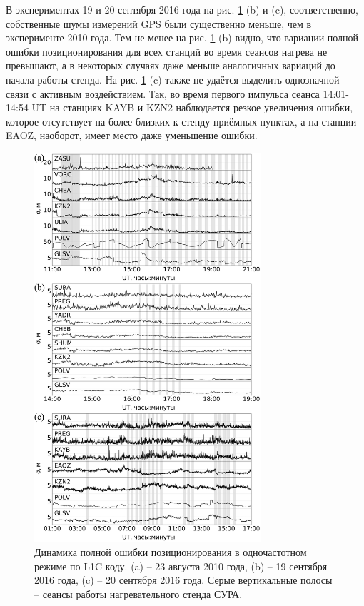В экспериментах 19 и 20 сентября 2016 года на рис. \ref{fig-l1c-sura} (b) и (c), соответственно, собственные шумы измерений GPS были существенно меньше, чем в эксперименте 2010 года.
Тем не менее на рис. \ref{fig-l1c-sura} (b) видно, что вариации полной ошибки позиционирования для всех станций во время сеансов нагрева не превышают, а в некоторых случаях даже меньше аналогичных вариаций до начала работы стенда. 
На рис. \ref{fig-l1c-sura} (c) также не удаётся выделить однозначной связи с активным воздействием. 
Так, во время первого импульса сеанса 14:01-14:54 UT на станциях KAYB и KZN2 наблюдается резкое увеличения ошибки, которое отсутствует на более близких к стенду приёмных пунктах, а на станции EAOZ, наоборот, имеет место даже уменьшение ошибки. 
\begin{figure}[h]
\centering    
\includegraphics[width=0.75\textwidth]{fig/l1c-sura.png}    
\caption{Динамика полной ошибки позиционирования в одночастотном режиме по L1C коду. (a) -- 23 августа 2010 года, (b) -- 19 сентября 2016 года, (c) -- 20 сентября 2016 года. Серые вертикальные полосы -- сеансы работы нагревательного стенда СУРА.}
\label{fig-l1c-sura}      
\end{figure} 
\clearpage